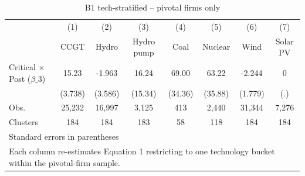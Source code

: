 \begin{table}[htbp]\centering
\caption{B1 tech-stratified -- pivotal firms only}
\begin{tabular}{l*{7}{c}}
\toprule
                    &\multicolumn{1}{c}{(1)}&\multicolumn{1}{c}{(2)}&\multicolumn{1}{c}{(3)}&\multicolumn{1}{c}{(4)}&\multicolumn{1}{c}{(5)}&\multicolumn{1}{c}{(6)}&\multicolumn{1}{c}{(7)}\\
                    &\multicolumn{1}{c}{CCGT}&\multicolumn{1}{c}{Hydro}&\multicolumn{1}{c}{Hydro pump}&\multicolumn{1}{c}{Coal}&\multicolumn{1}{c}{Nuclear}&\multicolumn{1}{c}{Wind}&\multicolumn{1}{c}{Solar PV}\\
\midrule
Critical $\times$ Post ($\beta\_3$)&       15.23&      -1.963&       16.24&       69.00&       63.22&      -2.244&           0\\
                    &     (3.738)&     (3.586)&     (15.34)&     (34.36)&     (35.88)&     (1.779)&         (.)\\
\midrule
Obs.                &      25,232&      16,997&       3,125&         413&       2,440&      31,344&       7,276\\
Clusters            &         184&         184&         183&          58&         118&         184&         184\\
\bottomrule
\multicolumn{8}{l}{\footnotesize Standard errors in parentheses}\\
\multicolumn{8}{l}{\footnotesize Each column re-estimates Equation 1 restricting to one technology bucket within the pivotal-firm sample.}\\
\end{tabular}
\end{table}
